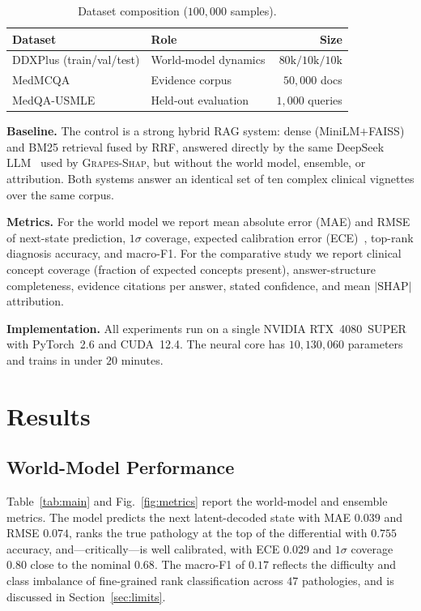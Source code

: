 \documentclass[conference]{IEEEtran}
\newcommand{\method}{\textsc{Grapes-Shap}}
\begin{document}
\begin{table}[t]
\caption{Dataset composition ($100{,}000$ samples).}
\label{tab:data}
\centering
\small
\begin{tabular}{llr}
\toprule
\textbf{Dataset} & \textbf{Role} & \textbf{Size}\\
\midrule
DDXPlus (train/val/test) & World-model dynamics & $80\text{k}/10\text{k}/10\text{k}$\\
MedMCQA                  & Evidence corpus      & $50{,}000$ docs\\
MedQA-USMLE              & Held-out evaluation  & $1{,}000$ queries\\
\bottomrule
\end{tabular}
\end{table}

\textbf{Baseline.} The control is a strong hybrid RAG system: dense
(MiniLM$+$FAISS) and BM25 retrieval fused by RRF, answered directly by the same
DeepSeek LLM~\cite{deepseek2024} used by \method, but without the world model,
ensemble, or attribution. Both systems answer an identical set of ten complex
clinical vignettes over the same corpus.

\textbf{Metrics.} For the world model we report mean absolute error (MAE) and
RMSE of next-state prediction, $1\sigma$ coverage, expected calibration error
(ECE)~\cite{guo2017calibration}, top-rank diagnosis accuracy, and macro-F1.
For the comparative study we report clinical concept coverage (fraction of
expected concepts present), answer-structure completeness, evidence citations
per answer, stated confidence, and mean $|\text{SHAP}|$ attribution.

\textbf{Implementation.} All experiments run on a single NVIDIA RTX~4080~SUPER
with PyTorch~2.6 and CUDA~12.4. The neural core has $10{,}130{,}060$ parameters
and trains in under $20$ minutes.

\section{Results}
\subsection{World-Model Performance}
Table~\ref{tab:main} and Fig.~\ref{fig:metrics} report the world-model and
ensemble metrics. The model predicts the next latent-decoded state with
MAE $0.039$ and RMSE $0.074$, ranks the true pathology at the top of the
differential with $0.755$ accuracy, and---critically---is well calibrated, with
ECE $0.029$ and $1\sigma$ coverage $0.80$ close to the nominal $0.68$. The
macro-F1 of $0.17$ reflects the difficulty and class imbalance of fine-grained
rank classification across $47$ pathologies, and is discussed in
Section~\ref{sec:limits}.
\end{document}
